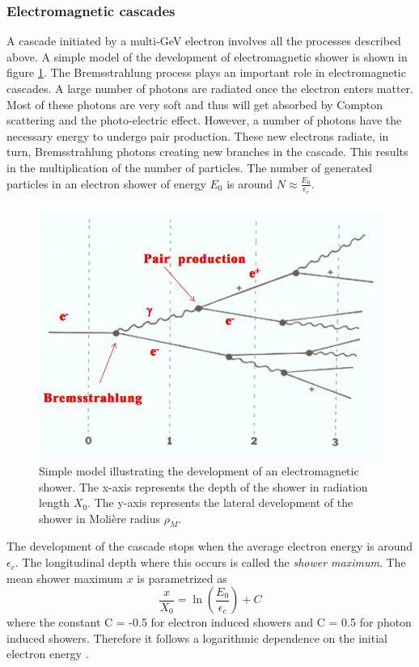\subsubsection{Electromagnetic cascades}
\label{subsubsec:EMcascade}

A cascade initiated by a multi-GeV electron involves all the processes described above. A simple model of the development of electromagnetic shower is shown in figure \ref{fig:EMDevel}. The Bremsstrahlung process plays an important role in electromagnetic cascades. A large number of photons are radiated once the electron enters matter. Most of these photons are very soft and thus will get absorbed by Compton scattering and the photo-electric effect. However, a number of photons have the necessary energy to undergo pair production. These new electrons radiate, in turn, Bremsstrahlung photons creating new branches in the cascade. This results in the multiplication of the number of particles. The number of generated particles in an electron shower of energy $E_0$ is around $N \approx \frac{E_0}{\epsilon_{c}}$.

\begin{figure}[htbp!]
  \centering
  \includegraphics[width=0.6\linewidth]{chap2/fig/EM_shower_dev.png}
  \caption{Simple model illustrating the development of an electromagnetic shower. The x-axis represents the depth of the shower in radiation length $X_0$. The y-axis represents the lateral development of the shower in Moli\`ere radius $\rho_{M}$.} \label{fig:EMDevel}
\end{figure}

The development of the cascade stops when the average electron energy is around $\epsilon_{c}$. The longitudinal depth where this occurs is called the \textit{shower maximum}. The mean shower maximum $x$ is parametrized as
\begin{equation}
  \frac{x}{X_0} = \ln\left(\frac{E_0}{\epsilon_{c}}\right) + C
\end{equation}
where the constant C = -0.5 for electron induced showers and C = 0.5 for photon induced showers. Therefore it follows a logarithmic dependence on the initial electron energy \cite{Wigmans:392793}.

